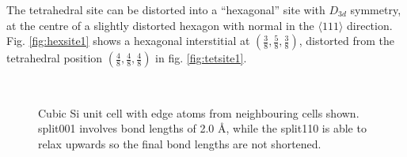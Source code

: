 \documentclass[11pt,bibliography=totoc,index=totoc]{scrbook}   %
\begin{document}
The tetrahedral site can be distorted into a ``hexagonal'' site with $D_{3d}$ symmetry, 
at the centre of a slightly distorted hexagon with normal in the $\langle 111 \rangle$ direction. 
Fig. \ref{fig:hexsite1} shows a hexagonal interstitial at $(\frac{3}{8},\frac{5}{8},\frac{3}{8})$, 
distorted from the tetrahedral position $(\frac{4}{8},\frac{4}{8},\frac{4}{8})$ in fig. \ref{fig:tetsite1}.


\begin{figure}[htp]
  \centering
  \\
  \caption{Cubic Si unit cell with edge atoms from neighbouring cells shown.
  split001 involves bond lengths of 2.0 Å,
  while the split110 is able to relax upwards so the final bond lengths are not shortened.
  }
  \label{fig:interstitials}
\end{figure}
\end{document}
